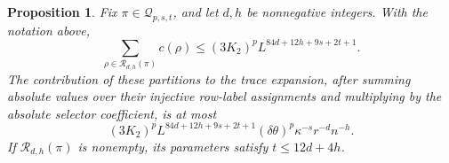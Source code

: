 \documentclass[11pt]{article}
\newtheorem{proposition}[theorem]{Proposition}
\theoremstyle{definition}
\theoremstyle{remark}
\theoremstyle{plain}
\begin{document}
\begin{proposition}
\label{prop:entry-contribution}
Fix $\pi\in\mathcal Q_{p,s,t}$, and let $d,h$ be nonnegative
integers. With the notation above,
\begin{equation}\label{eq:entry-partition-count}
 \sum_{\rho\in\mathcal R_{d,h}(\pi)}c(\rho)
       \le (3K_2)^p L^{84d+12h+9s+2t+1}.
\end{equation}
The contribution of these partitions to the trace expansion,
after summing absolute values over their injective row-label
assignments and multiplying by the absolute selector coefficient,
is at most
\begin{equation}\label{eq:fixed-equality-contribution}
 (3K_2)^p L^{84d+12h+9s+2t+1}
       (\delta\theta)^p\kappa^{-s}r^{-d}n^{-h}.
\end{equation}
If $\mathcal R_{d,h}(\pi)$ is nonempty, its parameters satisfy
$t\le12d+4h$.
\end{proposition}
\end{document}
